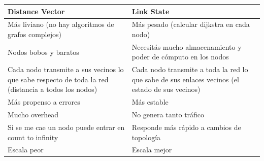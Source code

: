 \documentclass[]{article}
\begin{document}
\begin{center}
    \begin{table}[h]
        \centering
        \begin{tabular}{|p{7cm}|p{7cm}|}
            \hline
            \textbf{\large {Distance Vector}}                                                                            & \textbf{\large {Link State}}                                                                             \\ \hline
            Más liviano (no hay algoritmos de grafos complejos)                                                 & Más pesado (calcular dijkstra en cada nodo)                                                     \\ \hline
            Nodos bobos y baratos                                                                               & Necesitás mucho almacenamiento y poder de cómputo en los nodos                                  \\ \hline
            Cada nodo transmite a sus vecinos lo que sabe respecto de toda la red (distancia a todos los nodos) & Cada nodo transmite a toda la red lo que sabe de sus enlaces vecinos (el estado de sus vecinos) \\ \hline
            Más propenso a errores                                                                              & Más estable                                                                                     \\ \hline
            Mucho overhead                                                                                      & No genera tanto tráfico                                                                         \\ \hline
            Si se me cae un nodo puede entrar en count to infinity                                              & Responde más rápido a cambios de topología                                                      \\ \hline
            Escala peor                                                                                         & Escala mejor                                                                                    \\ \hline
        \end{tabular}
    \end{table}
\end{center}

\end{document}
